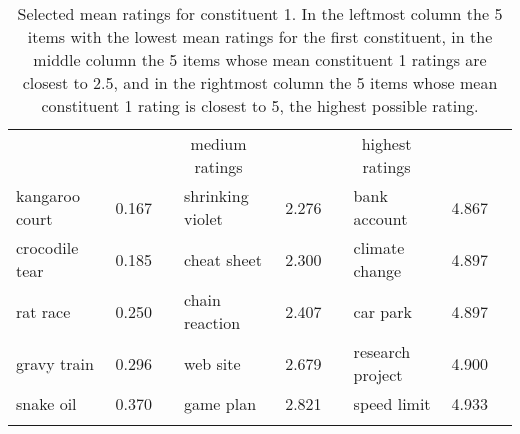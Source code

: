 \begin{table}[!htb]
  \centering
\footnotesize
\begin{tabular}{@{}lcclcclcc@{}}\lsptoprule
\multicolumn{2}{c}{lowest ratings}&\phantom{abc}&\multicolumn{2}{c}{medium ratings}&\phantom{abc}&\multicolumn{2}{c}{highest ratings}\\
\cmidrule{1-2}\cmidrule{4-5}\cmidrule{7-8}
kangaroo court&0.167&&shrinking violet&   2.276&&bank account   &4.867\\     
crocodile tear&0.185&&cheat sheet &  2.300     &&climate change   &4.897\\   
rat race&0.250      &&chain reaction  & 2.407  &&car park   &4.897\\         
gravy train&   0.296&&web site   &2.679        &&research project   &4.900\\ 
snake oil &  0.370  &&game plan  & 2.821       &&speed limit   &4.933\\
      \lspbottomrule  
\end{tabular}

  \caption{Selected mean ratings for constituent 1. In the leftmost
    column the 5 items with the lowest mean ratings for the first
    constituent, in the middle column the 5 items whose mean
    constituent 1 ratings
    are closest to 2.5, and in the rightmost column the 5 items whose
    mean constituent 1 rating is closest to 5, the highest possible rating.}
  \label{tab:constituent1-ratings}


\end{table}
